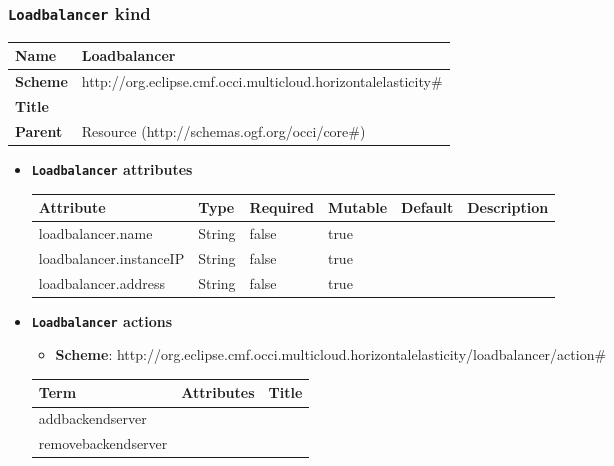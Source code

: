 \subsubsection{\texttt{Loadbalancer} kind}
\begin{center}
\begin{tabular}{|l|l|}
  \hline
  \textbf{Name} & Loadbalancer \\
  \hline  
  \textbf{Scheme} & http://org.eclipse.cmf.occi.multicloud.horizontalelasticity\# \\
  \hline
  \textbf{Title} &  \\
  \hline
  \textbf{Parent} & Resource (http://schemas.ogf.org/occi/core\#) \\
  \hline
\end{tabular}
\end{center}
\begin{itemize}
\item \textbf{\texttt{Loadbalancer} attributes}

\begin{tabularx}{\textwidth}{|l|l|p{1.4cm}|p{1.3cm}|l|X|}
  \hline
  \textbf{Attribute} & \textbf{Type} & \textbf{Required} & \textbf{Mutable} & \textbf{Default} & \textbf{Description} \\
  \hline  
  loadbalancer.name & String & false & true &  &  \\
  \hline
  loadbalancer.instanceIP & String & false & true &  &  \\
  \hline
  loadbalancer.address & String & false & true &  &  \\
  \hline
\end{tabularx}
\end{itemize}

\begin{itemize}
\item \textbf{\texttt{Loadbalancer} actions}

\begin{itemize}
	\item \textbf{Scheme}: http://org.eclipse.cmf.occi.multicloud.horizontalelasticity/loadbalancer/action\#
\end{itemize}

\begin{center}
\begin{tabular}{|l|l|l|}
  \hline
  \textbf{Term}  & \textbf{Attributes} & \textbf{Title} \\
  \hline  
  addbackendserver & &  \\
  \hline
  removebackendserver & &  \\
  \hline
\end{tabular}
\end{center}
\end{itemize}


